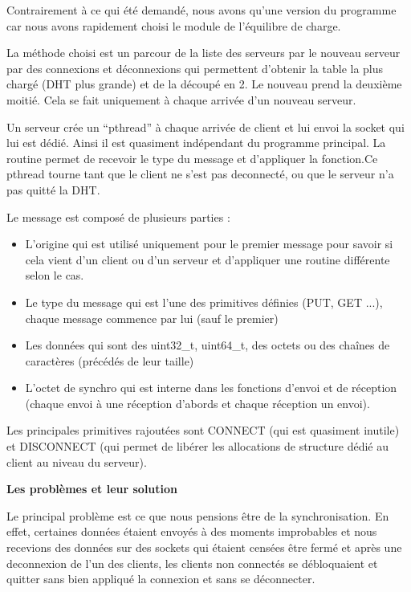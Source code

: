 \documentclass[a4paper,12pt]{article}
\begin{document}
Contrairement à ce qui été demandé, nous avons qu'une version du programme car nous avons rapidement choisi le module de l'équilibre de charge. 

La méthode choisi est un parcour de la liste des serveurs par le nouveau serveur par des connexions et déconnexions qui permettent d'obtenir la table la plus chargé (DHT plus grande) et de la découpé en 2. Le nouveau prend la deuxième moitié. Cela se fait uniquement à chaque arrivée d'un nouveau serveur.

Un serveur crée un ``pthread'' à chaque arrivée de client et lui envoi la socket qui lui est dédié. Ainsi il est quasiment indépendant du programme principal. La routine permet de recevoir le type du message et d'appliquer la fonction.Ce pthread tourne tant que le client ne s'est pas deconnecté, ou que le serveur n'a pas quitté la DHT.

Le message est composé de plusieurs parties : 
\begin{itemize}
\item L'origine qui est utilisé uniquement pour le premier message pour savoir si cela vient d'un client ou d'un serveur et d'appliquer une routine différente selon le cas.
\item Le type du message qui est l'une des primitives définies (PUT, GET ...), chaque message commence par lui (sauf le premier)
\item Les données qui sont des uint32\_t, uint64\_t, des octets ou des chaînes de caractères (précédés de leur taille)
\item L'octet de synchro qui est interne dans les fonctions d'envoi et de réception (chaque envoi à une réception d'abords et chaque réception un envoi).
\end{itemize}

Les principales primitives rajoutées sont CONNECT (qui est quasiment inutile) et DISCONNECT (qui permet de libérer les allocations de structure dédié au client au niveau du serveur).

\vspace{0.5cm}
\large{\bf Les problèmes et leur solution} \normalsize

Le principal problème est ce que nous pensions être de la synchronisation. En effet, certaines données étaient envoyés à des moments improbables et nous recevions des données sur des sockets qui étaient censées être fermé et après une deconnexion de l'un des clients, les clients non connectés se débloquaient et quitter sans bien appliqué la connexion et sans se déconnecter.
\end{document}
